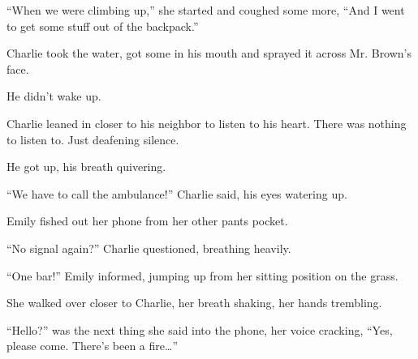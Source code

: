 “When we were climbing up,” she started and coughed some more, “And I went to get some stuff out of the backpack.”

Charlie took the water, got some in his mouth and sprayed it across Mr. Brown's face.

He didn't wake up.

Charlie leaned in closer to his neighbor to listen to his heart. There was nothing to listen to. Just deafening silence.

He got up, his breath quivering.

“We have to call the ambulance!” Charlie said, his eyes watering up.

Emily fished out her phone from her other pants pocket.

“No signal again?” Charlie questioned, breathing heavily.

“One bar!” Emily informed, jumping up from her sitting position on the grass.

She walked over closer to Charlie, her breath shaking, her hands trembling.

“Hello?” was the next thing she said into the phone, her voice cracking, “Yes, please come. There's been a fire…”